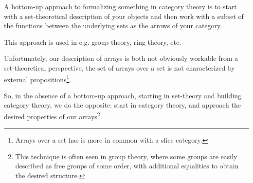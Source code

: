 \documentclass{DIKU-report-variant}
\begin{document}
A bottom-up approach to formalizing something in category theory is to
start with a set-theoretical description of your objects
and then work with a subset of the functions between the underlying sets as
the arrows of your category.

This approach is used in e.g. group theory, ring theory, etc.

Unfortunately, our description of arrays is both not obviously workable from a
set-theoretical perspective, the set of arrays over a set is not characterized by
external propositions\footnote{Arrays over a set has is more in common with a slice category.}.

So, in the absence of a bottom-up approach, starting in set-theory and building category theory,
we do the opposite: start in category theory, and approach the desired properties of our arrays\footnote{This technique is often seen in group theory, where some groups are easily described as
free groups of some order, with additional equalities to obtain the desired structure.}.
\end{document}
